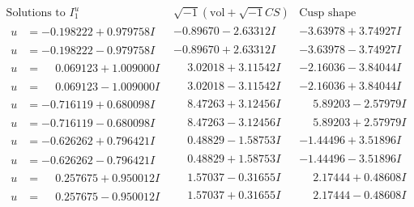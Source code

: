 \documentclass[1p]{elsarticle_modified}
\theoremstyle{definition}
\newcommand{\I}{\sqrt{-1}}
\begin{document}
$$\begin{array}{c|c|c}  
\text{Solutions to }I^u_{1}& \I (\text{vol} + \sqrt{-1}CS) & \text{Cusp shape}\\
 \hline 
\begin{aligned}
u &= -0.198222 + 0.979758 I\end{aligned}
 & -0.89670 - 2.63312 I & -3.63978 + 3.74927 I \\ \hline\begin{aligned}
u &= -0.198222 - 0.979758 I\end{aligned}
 & -0.89670 + 2.63312 I & -3.63978 - 3.74927 I \\ \hline\begin{aligned}
u &= \phantom{-}0.069123 + 1.009000 I\end{aligned}
 & \phantom{-}3.02018 + 3.11542 I & -2.16036 - 3.84044 I \\ \hline\begin{aligned}
u &= \phantom{-}0.069123 - 1.009000 I\end{aligned}
 & \phantom{-}3.02018 - 3.11542 I & -2.16036 + 3.84044 I \\ \hline\begin{aligned}
u &= -0.716119 + 0.680098 I\end{aligned}
 & \phantom{-}8.47263 + 3.12456 I & \phantom{-}5.89203 - 2.57979 I \\ \hline\begin{aligned}
u &= -0.716119 - 0.680098 I\end{aligned}
 & \phantom{-}8.47263 - 3.12456 I & \phantom{-}5.89203 + 2.57979 I \\ \hline\begin{aligned}
u &= -0.626262 + 0.796421 I\end{aligned}
 & \phantom{-}0.48829 - 1.58753 I & -1.44496 + 3.51896 I \\ \hline\begin{aligned}
u &= -0.626262 - 0.796421 I\end{aligned}
 & \phantom{-}0.48829 + 1.58753 I & -1.44496 - 3.51896 I \\ \hline\begin{aligned}
u &= \phantom{-}0.257675 + 0.950012 I\end{aligned}
 & \phantom{-}1.57037 - 0.31655 I & \phantom{-}2.17444 + 0.48608 I \\ \hline\begin{aligned}
u &= \phantom{-}0.257675 - 0.950012 I\end{aligned}
 & \phantom{-}1.57037 + 0.31655 I & \phantom{-}2.17444 - 0.48608 I \\ \hline\begin{aligned}

\end{aligned}
\end{array}$$
\end{document}
